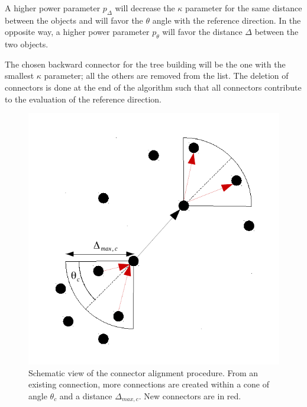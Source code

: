 \documentclass[cits]{JINST}
\begin{document}
A higher power parameter $p_{\Delta}$ will decrease the $\kappa$ parameter for the same distance between the objects and will favor the $\theta$ angle with the reference direction. In the opposite way, a higher power parameter $p_{\theta}$ will favor the distance $\Delta$ between the two objects. 

The chosen backward connector for the tree building will be the one with the smallest $\kappa$ parameter; all the others are removed from the list. The deletion of connectors is done at the end of the algorithm such that all connectors contribute to the evaluation of the reference direction.

\begin{figure}
  \vspace{-30pt}
  \begin{center}
    \includegraphics[width=\linewidth]{ConnectorAlignment.pdf}
  \end{center}
  \vspace{-10pt}
  \caption{\label{ARBOR_CONNECTOR_ALIGNEMENT} Schematic view of the connector alignment procedure. From an existing connection, more connections are created within a cone of angle $\theta_c$ and a distance $\Delta_{max,c}$. New connectors are in red.}
  \vspace{-30pt}
\end{figure}
\end{document}
